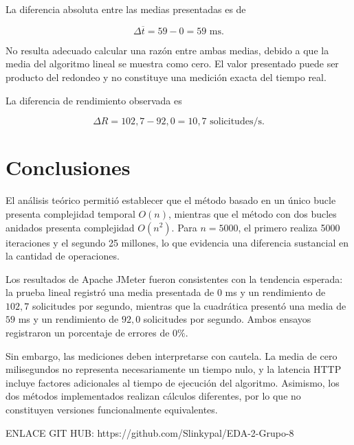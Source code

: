 \documentclass[runningheads]{llncs}
\begin{document}
La diferencia absoluta entre las medias presentadas
es de

\begin{equation}
\Delta \overline{t}=59-0=59\text{ ms}.
\end{equation}

No resulta adecuado calcular una razón entre ambas
medias, debido a que la media del algoritmo lineal
se muestra como cero. El valor presentado puede
ser producto del redondeo y no constituye una
medición exacta del tiempo real.

La diferencia de rendimiento observada es

\begin{equation}
\Delta R=102{,}7-92{,}0
=10{,}7\text{ solicitudes/s}.
\end{equation}


\section{Conclusiones}

El análisis teórico permitió establecer que el
método basado en un único bucle presenta
complejidad temporal $O(n)$, mientras que el
método con dos bucles anidados presenta
complejidad $O(n^2)$. Para $n=5000$, el primero
realiza 5000 iteraciones y el segundo 25 millones,
lo que evidencia una diferencia sustancial en
la cantidad de operaciones.

Los resultados de Apache JMeter fueron consistentes
con la tendencia esperada: la prueba lineal
registró una media presentada de $0$ ms y un
rendimiento de $102{,}7$ solicitudes por segundo,
mientras que la cuadrática presentó una media de
$59$ ms y un rendimiento de $92{,}0$ solicitudes
por segundo. Ambos ensayos registraron un
porcentaje de errores de $0\%$.

Sin embargo, las mediciones deben interpretarse
con cautela. La media de cero milisegundos no
representa necesariamente un tiempo nulo, y la
latencia HTTP incluye factores adicionales al
tiempo de ejecución del algoritmo. Asimismo,
los dos métodos implementados realizan cálculos
diferentes, por lo que no constituyen versiones
funcionalmente equivalentes.


ENLACE GIT HUB: https://github.com/Slinkypal/EDA-2-Grupo-8
\end{document}
